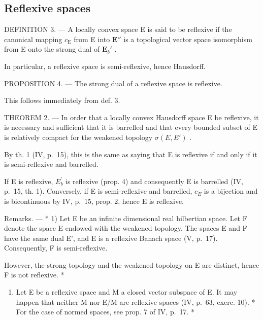 \subsection{Reflexive spaces}

DEFINITION 3. --- A locally convex space E is said to be reflexive if the canonical mapping \(c_{\mathrm{E}}\) from E into \(\mathbf{E}''\) is a topological vector space isomorphism from E onto the strong dual of \(\mathbf{E}_b'\) .

In particular, a reflexive space is semi-reflexive, hence Hausdorff.

PROPOSITION 4. --- The strong dual of a reflexive space is reflexive.

This follows immediately from def. 3.

THEOREM 2. --- In order that a locally convex Hausdorff space E be reflexive, it is necessary and sufficient that it is barrelled and that every bounded subset of E is relatively compact for the weakened topology \(\sigma(E, E')\) .

By th. 1 (IV, p.~15), this is the same as saying that E is reflexive if and only if it is semi-reflexive and barrelled.

If E is reflexive, \(E_{b}^{\prime}\) is reflexive (prop. 4) and consequently E is barrelled (IV, p.~15, th. 1). Conversely, if E is semi-reflexive and barrelled, \(c_{E}\) is a bijection and is bicontinuous by IV, p.~15, prop. 2, hence E is reflexive.

Remarks. --- * 1) Let E be an infinite dimensional real hilbertian space. Let F denote the space E endowed with the weakened topology. The spaces E and F have the same dual E', and E is a reflexive Banach space (V, p.~17). Consequently, F is semi-reflexive.

However, the strong topology and the weakened topology on E are distinct, hence F is not reflexive. *

\begin{enumerate}
\def\labelenumi{\arabic{enumi})}
\setcounter{enumi}{1}
\tightlist
\item
  Let E be a reflexive space and M a closed vector subspace of E. It may happen that neither M nor E/M are reflexive spaces (IV, p.~63, exerc. 10). * For the case of normed spaces, see prop. 7 of IV, p.~17. *
\end{enumerate}

